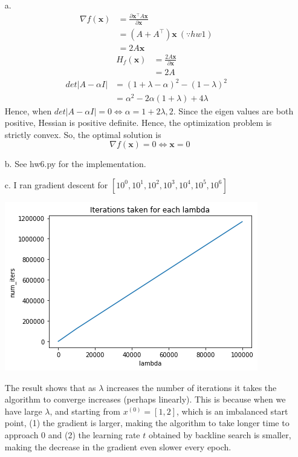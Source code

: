 \documentclass[11pt]{article}
\theoremstyle{remark}
\newcommand{\bx}{\mathbf{x}}
\begin{document}
\color{blue}
\begin{itemize}
\item[a.]
\begin{align*}
\nabla f(\bx)&=\frac{\partial \bx^\intercal A \bx}{\partial \bx}  &\\
&= (A+A^\intercal)\bx \ (\because hw1) &\\
&= 2A\bx
\end{align*}
\begin{align*}
H_f(\bx)&=\frac{2A\bx}{\partial \bx}  &\\
&= 2A
\end{align*}
\begin{align*}
det|A-\alpha I| &= (1+\lambda-\alpha)^2 - (1-\lambda)^2 &\\
&= \alpha^2 -2\alpha(1+\lambda) + 4\lambda
\end{align*}
Hence, when $det|A-\alpha I|=0 \Leftrightarrow \alpha=1+2\lambda,2$.
Since the eigen values are both positive, Hessian is positive definite. Hence, the optimization problem is strictly convex. So, the optimal solution is
$$\nabla f(\bx)=0 \Leftrightarrow \bx=0$$

\item[b.]
See hw6.py for the implementation.

\item[c.] I ran gradient descent for $[10^0,10^1,10^2,10^3,10^4,10^5,10^6]$

\includegraphics[scale=0.7]{im1}

The result shows that as $\lambda$ increases the number of iterations it takes the algorithm to converge increases (perhaps linearly). This is because when we have large $\lambda$, and starting from $x^{(0)}=[1,2]$, which is an imbalanced start point, (1) the gradient is larger, making the algorithm to take longer time to approach 0 and (2) the learning rate $t$ obtained by backline search is smaller, making the decrease in the gradient even slower every epoch.


\end{itemize}
\end{document}
